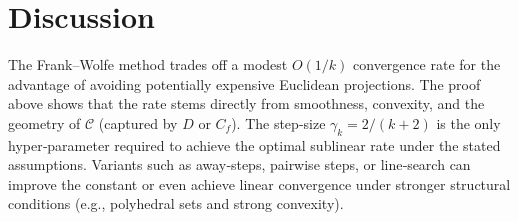 \documentclass{article}
\begin{document}
\newpage
\section*{Discussion}
The Frank–Wolfe method trades off a modest $O(1/k)$ convergence rate for the advantage of avoiding potentially expensive Euclidean projections. The proof above shows that the rate stems directly from smoothness, convexity, and the geometry of $\mathcal C$ (captured by $D$ or $C_{f}$). The step‑size $\gamma_{k}=2/(k+2)$ is the only hyper‑parameter required to achieve the optimal sublinear rate under the stated assumptions. Variants such as away‑steps, pairwise steps, or line‑search can improve the constant or even achieve linear convergence under stronger structural conditions (e.g., polyhedral sets and strong convexity).
\end{document}
